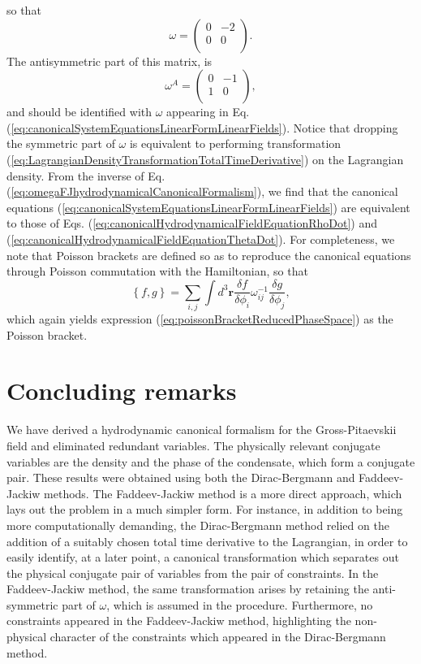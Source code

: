 \documentclass[twocolumn, nofootinbib, nobibnotes, amsmath,amssymb,aps, pra, floatfix]{revtex4-1}
\renewcommand{\v}[1]{\ensuremath{\mathbf{#1}}} %
\begin{document}
so that
\begin{equation}
  \omega=
  \begin{pmatrix}
    0&-2\\
    0&0\\
  \end{pmatrix}
  .
  \label{}
\end{equation}
The antisymmetric part of this matrix, is
\begin{equation}
  \omega^A=
  \begin{pmatrix}
   0&-1\\
   1&0\\
  \end{pmatrix}
  ,
  \label{eq:omegaFJhydrodynamicalCanonicalFormalism}
\end{equation}
and should be identified with $\omega$ appearing in Eq. (\ref{eq:canonicalSystemEquationsLinearFormLinearFields}).
Notice that dropping the symmetric part of $\omega$ is equivalent to performing transformation (\ref{eq:LagrangianDensityTransformationTotalTimeDerivative}) on the Lagrangian density.
From the inverse of Eq. (\ref{eq:omegaFJhydrodynamicalCanonicalFormalism}), we find that the canonical equations (\ref{eq:canonicalSystemEquationsLinearFormLinearFields}) are equivalent to those of Eqs. (\ref{eq:canonicalHydrodynamicalFieldEquationRhoDot}) and (\ref{eq:canonicalHydrodynamicalFieldEquationThetaDot}).
For completeness, we note that Poisson brackets are defined so as to reproduce the canonical equations through Poisson commutation with the Hamiltonian, so that \cite{jackiw1994quantization}
\begin{equation}
  \left\{ f,g\right\}=\sum_{i,j}\int d^3\v{r}\frac{\delta f}{\delta\phi_i}\omega_{ij}^{-1}\frac{\delta g}{\delta\phi_j},
  \label{}
\end{equation}
which again yields expression (\ref{eq:poissonBracketReducedPhaseSpace}) as the Poisson bracket.
\section{Concluding remarks}
We have derived a hydrodynamic canonical formalism for the Gross-Pitaevskii field and eliminated redundant variables.
The physically relevant conjugate variables are the density and the phase of the condensate, which form a conjugate pair.
These results were obtained using both the Dirac-Bergmann and Faddeev-Jackiw methods.
The Faddeev-Jackiw method is a more direct approach, which lays out the problem in a much simpler form.
For instance, in addition to being more computationally demanding, the Dirac-Bergmann method relied on the addition of a suitably chosen total time derivative to the Lagrangian, in order to easily identify, at a later point, a canonical transformation which separates out the physical conjugate pair of variables from the pair of constraints.
In the Faddeev-Jackiw method, the same transformation arises by retaining the anti-symmetric part of $\omega$, which is assumed in the procedure.
Furthermore, no constraints appeared in the Faddeev-Jackiw method, highlighting the non-physical character of the constraints which appeared in the Dirac-Bergmann method.


\end{document}
